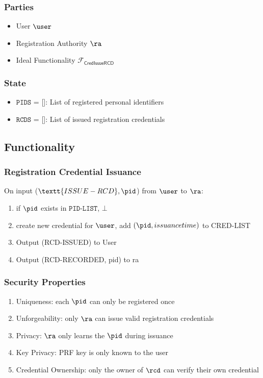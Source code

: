\subsubsection{Parties}
\begin{itemize}
    \item User $\user$
    \item Registration Authority $\ra$
    \item Ideal Functionality $\mathcal{F}_{\mathsf{CredIssueRCD}}$
\end{itemize}

\subsubsection{State}
\begin{itemize}
    \item $\texttt{PIDS}$ = []: List of registered personal identifiers
    \item $\texttt{RCDS}$ = []: List of issued registration credentials
\end{itemize}

\subsection{Functionality}

\subsubsection{Registration Credential Issuance}
On input ($\textt{ISSUE-RCD}, \pid$) from $\user$ to $\ra$:

\begin{enumerate}
    \item if $\pid$ exists in $\texttt{PID-LIST}$, $\bot$
    \item create new credential for $\user$, add $(\pid, issuancetime)$ to CRED-LIST
    \item Output (RCD-ISSUED) to User
    \item Output (RCD-RECORDED, pid) to ra
\end{enumerate}

\subsubsection{Security Properties}
\begin{enumerate}
    \item Uniqueness: each $\pid$ can only be registered once
    \item Unforgeability: only $\ra$ can issue valid registration credentials
    \item Privacy: $\ra$ only learns the $\pid$ during issuance
    \item Key Privacy: PRF key is only known to the user
    \item Credential Ownership: only the owner of $\rcd$ can verify their own credential
\end{enumerate}




